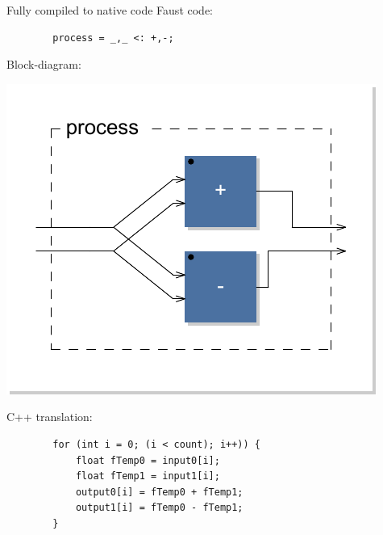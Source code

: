 \begin{frame}[fragile]{Fully compiled to native code}
    Faust code:
    \begin{lstlisting}
        process = _,_ <: +,-;
    \end{lstlisting}
    
    Block-diagram:
    \begin{center}
        \includegraphics[scale=0.4]{images/expaw}
    \end{center}
    
    C++ translation:
    \begin{lstlisting}
        for (int i = 0; (i < count); i++)) {
            float fTemp0 = input0[i];
            float fTemp1 = input1[i];
            output0[i] = fTemp0 + fTemp1;
            output1[i] = fTemp0 - fTemp1;
        }
    \end{lstlisting}
    
\end{frame}

